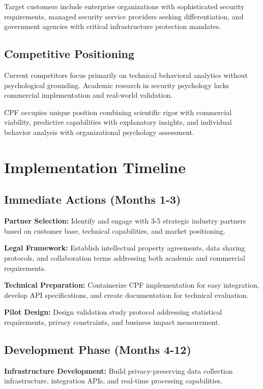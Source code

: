 \documentclass[10pt,twocolumn]{IEEEtran}
\begin{document}
Target customers include enterprise organizations with sophisticated security requirements, managed security service providers seeking differentiation, and government agencies with critical infrastructure protection mandates.

\subsection{Competitive Positioning}

Current competitors focus primarily on technical behavioral analytics without psychological grounding. Academic research in security psychology lacks commercial implementation and real-world validation.

CPF occupies unique position combining scientific rigor with commercial viability, predictive capabilities with explanatory insights, and individual behavior analysis with organizational psychology assessment.

\section{Implementation Timeline}

\subsection{Immediate Actions (Months 1-3)}

\textbf{Partner Selection:} Identify and engage with 3-5 strategic industry partners based on customer base, technical capabilities, and market positioning.

\textbf{Legal Framework:} Establish intellectual property agreements, data sharing protocols, and collaboration terms addressing both academic and commercial requirements.

\textbf{Technical Preparation:} Containerize CPF implementation for easy integration, develop API specifications, and create documentation for technical evaluation.

\textbf{Pilot Design:} Design validation study protocol addressing statistical requirements, privacy constraints, and business impact measurement.

\subsection{Development Phase (Months 4-12)}

\textbf{Infrastructure Development:} Build privacy-preserving data collection infrastructure, integration APIs, and real-time processing capabilities.
\end{document}
